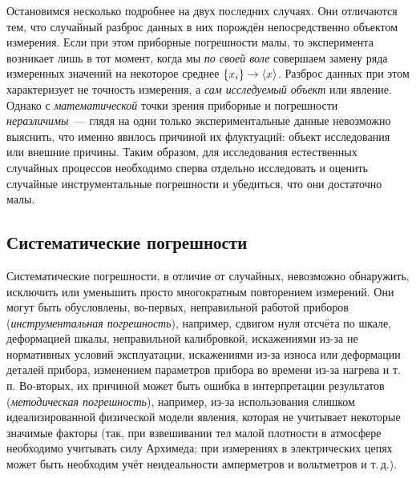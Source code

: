 Остановимся несколько подробнее на двух последних случаях. Они отличаются
тем, что случайный разброс данных в них порождён непосредственно объектом
измерения. Если при этом приборные погрешности малы, то 
эксперимента возникает лишь в тот момент, когда мы \emph{по своей
воле} совершаем замену ряда измеренных значений на некоторое среднее
$\left\{ x_{i}\right\} \to\left<x\right>$. Разброс данных при этом
характеризует не точность измерения, а \emph{сам исследуемый объект} или
явление. Однако с \emph{математической} точки зрения приборные и
погрешности \emph{неразличимы}~--- глядя на одни только
экспериментальные данные невозможно выяснить, что именно явилось причиной
их флуктуаций: объект исследования или внешние причины.
Таким образом, для исследования естественных случайных процессов необходимо
сперва отдельно исследовать и оценить случайные инструментальные погрешности
и убедиться, что они достаточно малы.


\subsection{Систематические погрешности}

Систематические погрешности, в отличие от случайных, невозможно обнаружить,
исключить или уменьшить просто многократным повторением измерений.
Они могут быть обусловлены, во-первых, неправильной работой приборов
(\emph{инструментальная погрешность}), например, сдвигом нуля отсчёта
по шкале, деформацией шкалы, неправильной калибровкой, искажениями
из-за не нормативных условий эксплуатации, искажениями из-за износа
или деформации деталей прибора, изменением параметров прибора во времени
из-за нагрева и т.\,п. Во-вторых, их причиной может быть ошибка в интерпретации
результатов (\emph{методическая погрешность}), например, из-за использования
слишком идеализированной физической модели явления, которая не учитывает
некоторые значимые факторы (так, при взвешивании тел малой плотности
в атмосфере необходимо учитывать силу Архимеда; при измерениях в электрических
цепях может быть необходим учёт неидеальности амперметров и вольтметров
и т.\,д.).

